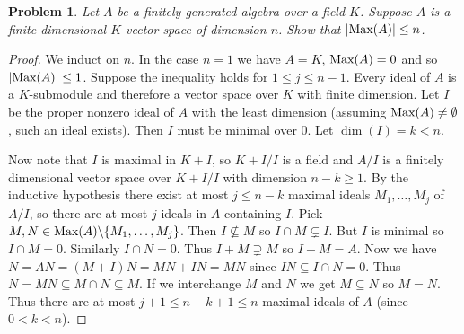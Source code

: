 \documentclass{article}
\newcommand{\Max}{\textup{Max}}
\newtheorem{problem}{Problem}
\begin{document}
\begin{problem}
Let $A$ be a finitely generated algebra over a field $K$. Suppose $A$ is a finite dimensional $K$-vector space of dimension $n$. Show that $|\Max(A)| \leq n$.
\end{problem}
\begin{proof}
We induct on $n$. In the case $n = 1$ we have $A = K$, $\Max(A) = 0$ and so $|\Max(A)| \leq 1$. Suppose the inequality holds for $1 \leq j \leq n-1$. Every ideal of $A$ is a $K$-submodule and therefore a vector space over $K$ with finite dimension. Let $I$ be the proper nonzero ideal of $A$ with the least dimension (assuming $\Max(A) \neq \emptyset$, such an ideal exists). Then $I$ must be minimal over $0$. Let $\dim(I) = k < n$.

Now note that $I$ is maximal in $K+I$, so $K+I/I$ is a field and $A/I$ is a finitely dimensional vector space over $K+I/I$ with dimension $n - k \geq 1$. By the inductive hypothesis there exist at most $j \leq n-k$ maximal ideals $M_1, \dots , M_j$ of $A/I$, so there are at most $j$ ideals in $A$ containing $I$. Pick $M, N \in \Max(A) \backslash \{M_1, \dots , M_j\}$. Then $I \nsubseteq M$ so $I \cap M \subsetneq I$. But $I$ is minimal so $I \cap M = 0$. Similarly $I \cap N = 0$. Thus $I + M \supsetneq M$ so $I + M = A$. Now we have $N = AN = (M+I)N = MN + IN = MN$ since $IN \subseteq I \cap N = 0$. Thus $N = MN \subseteq M \cap N \subseteq M$. If we interchange $M$ and $N$ we get $M \subseteq N$ so $M = N$. Thus there are at most $j + 1 \leq n-k+1 \leq n$ maximal ideals of $A$ (since $0 < k < n$).
\end{proof}
\end{document}
